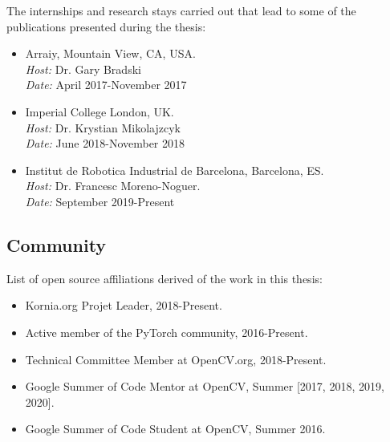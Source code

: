 The internships and research stays carried out that lead to some of the publications presented during the thesis:\\

\begin{itemize}
\item Arraiy, Mountain View, CA, USA.\\
\textit{Host:} Dr. Gary Bradski\\
\textit{Date:} April 2017-November 2017\\
\item Imperial College London, UK.\\
\textit{Host:} Dr. Krystian Mikolajzcyk\\
\textit{Date:} June 2018-November 2018\\
\item Institut de Robotica Industrial de Barcelona, Barcelona, ES. \\
\textit{Host:} Dr. Francesc Moreno-Noguer.\\
\textit{Date:} September 2019-Present\\
\end{itemize}

\subsection{Community}

List of open source affiliations derived of the work in this thesis:\\

\begin{itemize}
\item Kornia.org Projet Leader, 2018-Present.
\item Active member of the PyTorch community, 2016-Present.
\item Technical Committee Member at OpenCV.org, 2018-Present.
\item Google Summer of Code Mentor at OpenCV, Summer [2017, 2018, 2019, 2020].
\item Google Summer of Code Student at OpenCV, Summer 2016.
\end{itemize}